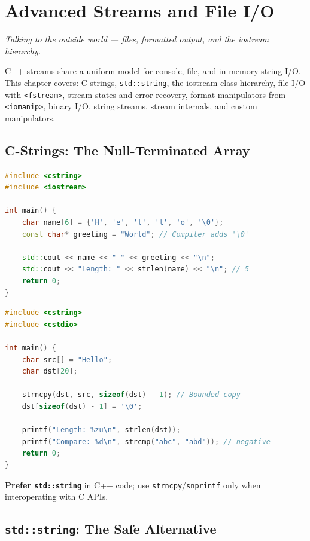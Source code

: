 \chapter{Advanced Streams and File I/O}
\label{ch:streams-file-io}

\textit{Talking to the outside world --- files, formatted output, and the iostream hierarchy.}

C++ streams share a uniform model for console, file, and in-memory string I/O. This chapter covers: C-strings, \texttt{std::string}, the iostream class hierarchy, file I/O with \texttt{<fstream>}, stream states and error recovery, format manipulators from \texttt{<iomanip>}, binary I/O, string streams, stream internals, and custom manipulators.

\section{C-Strings: The Null-Terminated Array}
\label{sec:c-strings}

\begin{lstlisting}[language=C++, caption={C-string basics and null terminator}]
#include <cstring>
#include <iostream>

int main() {
    char name[6] = {'H', 'e', 'l', 'l', 'o', '\0'};
    const char* greeting = "World"; // Compiler adds '\0'

    std::cout << name << " " << greeting << "\n";
    std::cout << "Length: " << strlen(name) << "\n"; // 5
    return 0;
}
\end{lstlisting}

\begin{lstlisting}[language=C++, caption={Safer C-string manipulation}]
#include <cstring>
#include <cstdio>

int main() {
    char src[] = "Hello";
    char dst[20];

    strncpy(dst, src, sizeof(dst) - 1); // Bounded copy
    dst[sizeof(dst) - 1] = '\0';

    printf("Length: %zu\n", strlen(dst));
    printf("Compare: %d\n", strcmp("abc", "abd")); // negative
    return 0;
}
\end{lstlisting}

\textbf{Prefer \texttt{std::string}} in C++ code; use \texttt{strncpy}/\texttt{snprintf} only when interoperating with C APIs.

\section{\texttt{std::string}: The Safe Alternative}
\label{sec:std-string-ch10}

